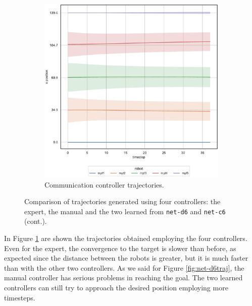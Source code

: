 \begin{figure}[!htb]
\begin{center}
\begin{subfigure}[h]{0.49\textwidth}
			\includegraphics[width=.9\textwidth]{contents/images/net-c6/position-overtime-learned_communication}
			\caption{Communication controller trajectories.}
		\end{subfigure}
	\end{center}
	\vspace{-0.5cm}
	\caption[]{Comparison of trajectories generated using four controllers: the 
	expert, the manual and the two learned from \texttt{net-d6} and 
	\texttt{net-c6} (cont.).}
	\label{fig:net-c6traj}
\end{figure}
In Figure \ref{fig:net-c6traj} are shown the trajectories obtained employing the 
four controllers. Even for the expert, the convergence to the target is slower than 
before, as expected since the distance between the robots is greater, but it is 
much faster than with the other two controllers. As we said for Figure 
\ref{fig:net-d6traj}, the manual controller has serious problems in reaching the 
goal. The two learned controllers can still try to approach the desired position 
employing more timesteps.

